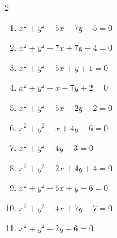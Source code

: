 \begin{multicols}{2}
\begin{enumerate}
  \item $x^{2}+y^{2}+5x-7y-5=0$


  \item $x^{2}+y^{2}+7x+7y-4=0$


  \item $x^{2}+y^{2}+5x+y+1=0$


  \item $x^{2}+y^{2}-x-7y+2=0$


  \item $x^{2}+y^{2}+5x-2y-2=0$


  \item $x^{2}+y^{2}+x+4y-6=0$


  \item $x^{2}+y^{2}+4y-3=0$


  \item $x^{2}+y^{2}-2x+4y+4=0$

        \phantom{$\displaystyle 中心\: \left(1,-2\right), \quad 半径 \ 1$}

  \item $x^{2}+y^{2}-6x+y-6=0$


  \item $x^{2}+y^{2}-4x+7y-7=0$


  \item $x^{2}+y^{2}-2y-6=0$


\end{enumerate}
\end{multicols}
